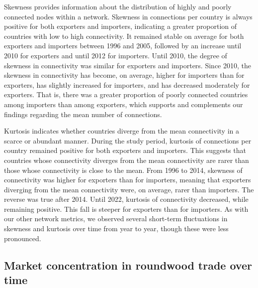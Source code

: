 \documentclass[
  authoryear,
  review,
  3p]{elsarticle}
\begin{document}
Skewness provides information about the distribution of highly and
poorly connected nodes within a network. Skewness in connections per
country is always positive for both exporters and importers, indicating
a greater proportion of countries with low to high connectivity. It
remained stable on average for both exporters and importers between 1996
and 2005, followed by an increase until 2010 for exporters and until
2012 for importers. Until 2010, the degree of skewness in connectivity
was similar for exporters and importers. Since 2010, the skewness in
connectivity has become, on average, higher for importers than for
exporters, has slightly increased for importers, and has decreased
moderately for exporters. That is, there was a greater proportion of
poorly connected countries among importers than among exporters, which
supports and complements our findings regarding the mean number of
connections.

Kurtosis indicates whether countries diverge from the mean connectivity
in a scarce or abundant manner. During the study period, kurtosis of
connections per country remained positive for both exporters and
importers. This suggests that countries whose connectivity diverges from
the mean connectivity are rarer than those whose connectivity is close
to the mean. From 1996 to 2014, skewness of connectivity was higher for
exporters than for importers, meaning that exporters diverging from the
mean connectivity were, on average, rarer than importers. The reverse
was true after 2014. Until 2022, kurtosis of connectivity decreased,
while remaining positive. This fall is steeper for exporters than for
importers. As with our other network metrics, we observed several
short-term fluctuations in skewness and kurtosis over time from year to
year, though these were less pronounced.

\subsection{Market concentration in roundwood trade over
time}\label{market-concentration-in-roundwood-trade-over-time}
\end{document}
